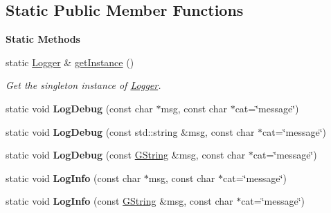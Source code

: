 \subsection*{Static Public Member Functions}
\begin{Indent}\textbf{ Static Methods}\par
\begin{DoxyCompactItemize}
\item 
\mbox{\label{classrev_1_1_logger_ab435f37bb27892955d5968c247338756}} 
static \mbox{\hyperlink{classrev_1_1_logger}{Logger}} \& \mbox{\hyperlink{classrev_1_1_logger_ab435f37bb27892955d5968c247338756}{get\+Instance}} ()
\begin{DoxyCompactList}\small\item\em Get the singleton instance of \mbox{\hyperlink{classrev_1_1_logger}{Logger}}. \end{DoxyCompactList}\item 
\mbox{\label{classrev_1_1_logger_a5b2ee87f9a21e7819496300d29355132}} 
static void {\bfseries Log\+Debug} (const char $\ast$msg, const char $\ast$cat=\char`\"{}message\char`\"{})
\item 
\mbox{\label{classrev_1_1_logger_a8a6f65f7ff0bb5ba371588660f7235a1}} 
static void {\bfseries Log\+Debug} (const std\+::string \&msg, const char $\ast$cat=\char`\"{}message\char`\"{})
\item 
\mbox{\label{classrev_1_1_logger_a5e2c8039c79c0d734ac9413040b0509e}} 
static void {\bfseries Log\+Debug} (const \mbox{\hyperlink{classrev_1_1_g_string}{G\+String}} \&msg, const char $\ast$cat=\char`\"{}message\char`\"{})
\item 
\mbox{\label{classrev_1_1_logger_a999a136d847d78eb2ef64f12beb1fa49}} 
static void {\bfseries Log\+Info} (const char $\ast$msg, const char $\ast$cat=\char`\"{}message\char`\"{})
\item 
\mbox{\label{classrev_1_1_logger_a7d856af1c2c59d1700589538a1027d2f}} 
static void {\bfseries Log\+Info} (const \mbox{\hyperlink{classrev_1_1_g_string}{G\+String}} \&msg, const char $\ast$cat=\char`\"{}message\char`\"{})
\item 
\mbox{\label{classrev_1_1_logger_a2d183278fda95700e54ba8c7feedcc10}} 

\end{DoxyCompactItemize}
\end{Indent}
